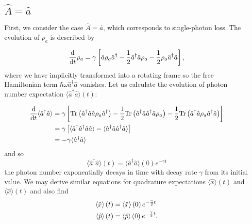 \subsection{$\hat{A} = \hat{a}$}\label{sec:A_a}
First, we consider the case $\hat{A}=\hat{a}$, which corresponds to single-photon loss. The evolution of $\rho_a$ is described by

\begin{equation}\label{eqn:phog_lindblad_single_photon_loss}
\frac{\mathrm{d}}{\mathrm{d}t} \rho_a = \gamma\left[\hat{a}\rho_a \hat{a}^\dagger - \frac{1}{2} \hat{a}^\dagger \hat{a} \rho_a - \frac{1}{2} \rho_a \hat{a}^\dagger \hat{a}\right],
\end{equation}
where we have implicitly transformed into a rotating frame so the free Hamiltonian term $\hbar \omega \hat{a}^\dagger \hat{a}$ vanishes. Let us calculate the evolution of photon number expectation $\langle \hat{a}^\dagger \hat{a}\rangle\left(t\right)$:

\begin{align}
\ddt \langle \hat{a}^\dagger \hat{a}\rangle &= \gamma \left[ \text{Tr}\left(\hat{a}^\dagger \hat{a} \hat{a} \rho_a \hat{a}^\dagger \right) - \frac{1}{2} \text{Tr}\left(\hat{a}^\dagger \hat{a} \hat{a}^\dagger \hat{a} \rho_a\right) - \frac{1}{2} \text{Tr}\left(\hat{a}^\dagger \hat{a} \rho_a \hat{a}^\dagger \hat{a}\right)\right] \notag \\
%
&= \gamma \left[ \langle \hat{a}^\dagger \hat{a}^\dagger \hat{a}\hat{a}\rangle - \langle \hat{a}^\dagger \hat{a} \hat{a}^\dagger \hat{a}\rangle \right] \notag \\
%
&= - \gamma \langle \hat{a}^\dagger \hat{a}\rangle
\end{align}
\noindent and so
\begin{equation}\label{eqn:phog_single_photon_loss_number_expectation}
\langle\hat{a}^\dagger \hat{a} \rangle \left(t\right) = \langle \hat{a}^\dagger \hat{a}\rangle \left(0\right) e^{- \gamma t}
\end{equation}
the photon number exponentially decays in time with decay rate $\gamma$ from its initial value. We may derive similar equations for quadrature expectations $\langle\hat{x}\rangle\left(t\right)$ and $\langle\hat{x}\rangle\left(t\right)$ and also find 
\begin{align}\label{eqn:phog_single_photon_loss_quadrature_expectation}
 \langle \hat{x}\rangle\left(t\right) &= \langle \hat{x}\rangle\left(0\right) e^{- \frac{\gamma}{2} t} \notag \\
%
 \langle \hat{p}\rangle\left(t\right) &= \langle \hat{p}\rangle \left(0\right) e^{- \frac{\gamma}{2} t}.
\end{align}

